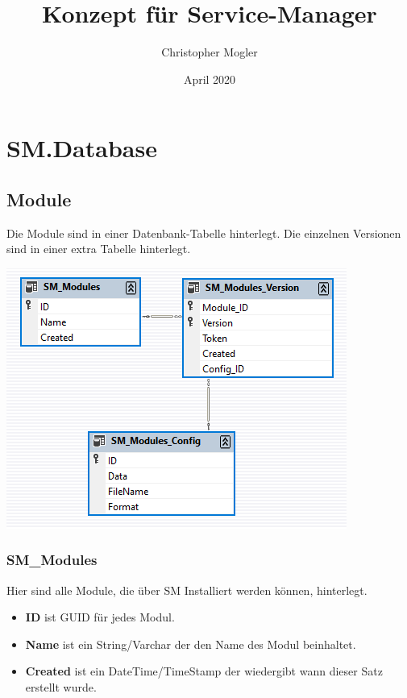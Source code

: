 \documentclass{article}
\title{Konzept für Service-Manager}
\author{Christopher Mogler}
\date{April 2020}
\begin{document}
\maketitle
\tableofcontents
\newpage

\section{SM.Database}

\subsection{Module}

Die Module sind in einer Datenbank-Tabelle hinterlegt. 
Die einzelnen Versionen sind in einer extra Tabelle hinterlegt.
\begin{center}
\includegraphics{db_modules}
\end{center}

\subsubsection{SM\_Modules}

Hier sind alle Module, die über SM Installiert werden können, hinterlegt.

\begin{itemize}
  \item \textbf{ID} ist GUID für jedes Modul.
  \item \textbf{Name} ist ein String/Varchar der den Name des Modul beinhaltet.
  \item \textbf{Created} ist ein DateTime/TimeStamp der wiedergibt wann dieser Satz erstellt wurde. 
\end{itemize}
\end{document}
